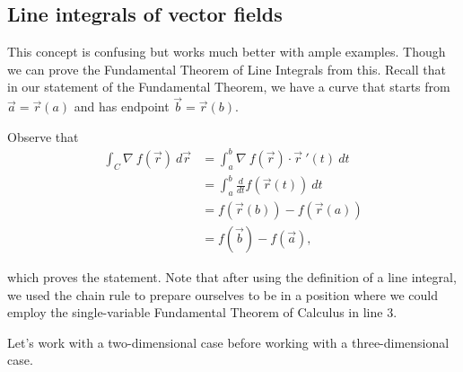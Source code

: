 \documentclass[a4paper, 12pt,oneside,openany]{book}
\begin{document}
\subsection{Line integrals of vector fields}


This concept is confusing but works much better with ample examples. Though we can prove the Fundamental Theorem of Line Integrals from this. Recall that in our statement of the Fundamental Theorem, we have a curve that starts from $\vec{a}=\vec{r}(a)$ and has endpoint $\vec{b}=\vec{r}(b)$.

Observe that \begin{align*} \int_C \nabla\ f(\vec{r}) \ d\vec{r} &= \int_a^b \nabla\ f(\vec{r}) \cdot \vec{r}\ '(t)\ dt \\ &= \int_a^b \frac{d}{dt} f(\vec{r}(t))\ dt \\ &= f(\vec{r}(b)) -  f(\vec{r}(a)) \\ &= f(\vec{b})-f(\vec{a}), \end{align*}

which proves the statement. Note that after using the definition of a line integral, we used the chain rule to prepare ourselves to be in a position where we could employ the single-variable Fundamental Theorem of Calculus in line 3.

Let's work with a two-dimensional case before working with a three-dimensional case. 
\end{document}
